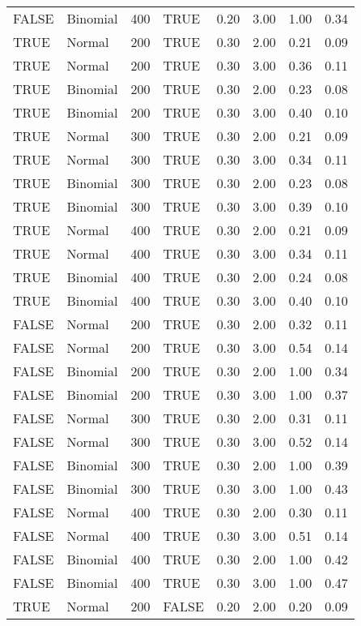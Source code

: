 \begin{longtable}{llrlrrrr}
  FALSE & Binomial & 400 & TRUE & 0.20 & 3.00 & 1.00 & 0.34 \\ 
  TRUE & Normal & 200 & TRUE & 0.30 & 2.00 & 0.21 & 0.09 \\ 
  TRUE & Normal & 200 & TRUE & 0.30 & 3.00 & 0.36 & 0.11 \\ 
  TRUE & Binomial & 200 & TRUE & 0.30 & 2.00 & 0.23 & 0.08 \\ 
  TRUE & Binomial & 200 & TRUE & 0.30 & 3.00 & 0.40 & 0.10 \\ 
  TRUE & Normal & 300 & TRUE & 0.30 & 2.00 & 0.21 & 0.09 \\ 
  TRUE & Normal & 300 & TRUE & 0.30 & 3.00 & 0.34 & 0.11 \\ 
  TRUE & Binomial & 300 & TRUE & 0.30 & 2.00 & 0.23 & 0.08 \\ 
  TRUE & Binomial & 300 & TRUE & 0.30 & 3.00 & 0.39 & 0.10 \\ 
  TRUE & Normal & 400 & TRUE & 0.30 & 2.00 & 0.21 & 0.09 \\ 
  TRUE & Normal & 400 & TRUE & 0.30 & 3.00 & 0.34 & 0.11 \\ 
  TRUE & Binomial & 400 & TRUE & 0.30 & 2.00 & 0.24 & 0.08 \\ 
  TRUE & Binomial & 400 & TRUE & 0.30 & 3.00 & 0.40 & 0.10 \\ 
  FALSE & Normal & 200 & TRUE & 0.30 & 2.00 & 0.32 & 0.11 \\ 
  FALSE & Normal & 200 & TRUE & 0.30 & 3.00 & 0.54 & 0.14 \\ 
  FALSE & Binomial & 200 & TRUE & 0.30 & 2.00 & 1.00 & 0.34 \\ 
  FALSE & Binomial & 200 & TRUE & 0.30 & 3.00 & 1.00 & 0.37 \\ 
  FALSE & Normal & 300 & TRUE & 0.30 & 2.00 & 0.31 & 0.11 \\ 
  FALSE & Normal & 300 & TRUE & 0.30 & 3.00 & 0.52 & 0.14 \\ 
  FALSE & Binomial & 300 & TRUE & 0.30 & 2.00 & 1.00 & 0.39 \\ 
  FALSE & Binomial & 300 & TRUE & 0.30 & 3.00 & 1.00 & 0.43 \\ 
  FALSE & Normal & 400 & TRUE & 0.30 & 2.00 & 0.30 & 0.11 \\ 
  FALSE & Normal & 400 & TRUE & 0.30 & 3.00 & 0.51 & 0.14 \\ 
  FALSE & Binomial & 400 & TRUE & 0.30 & 2.00 & 1.00 & 0.42 \\ 
  FALSE & Binomial & 400 & TRUE & 0.30 & 3.00 & 1.00 & 0.47 \\ 
  TRUE & Normal & 200 & FALSE & 0.20 & 2.00 & 0.20 & 0.09 \\ 

\end{longtable}
